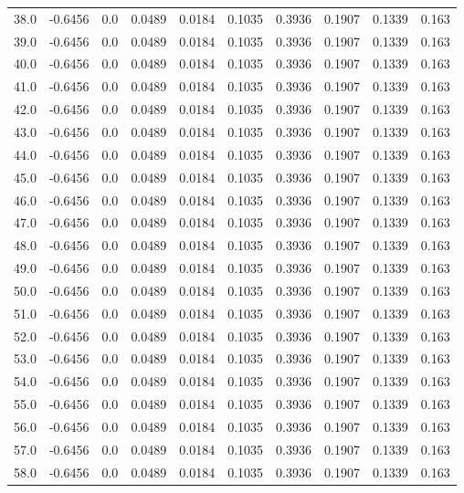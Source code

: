 \begin{longtable}{lrrrrrrrrr}
38.0 & -0.6456 & 0.0 & 0.0489 & 0.0184 & 0.1035 & 0.3936 & 0.1907 & 0.1339 & 0.163 \\
39.0 & -0.6456 & 0.0 & 0.0489 & 0.0184 & 0.1035 & 0.3936 & 0.1907 & 0.1339 & 0.163 \\
40.0 & -0.6456 & 0.0 & 0.0489 & 0.0184 & 0.1035 & 0.3936 & 0.1907 & 0.1339 & 0.163 \\
41.0 & -0.6456 & 0.0 & 0.0489 & 0.0184 & 0.1035 & 0.3936 & 0.1907 & 0.1339 & 0.163 \\
42.0 & -0.6456 & 0.0 & 0.0489 & 0.0184 & 0.1035 & 0.3936 & 0.1907 & 0.1339 & 0.163 \\
43.0 & -0.6456 & 0.0 & 0.0489 & 0.0184 & 0.1035 & 0.3936 & 0.1907 & 0.1339 & 0.163 \\
44.0 & -0.6456 & 0.0 & 0.0489 & 0.0184 & 0.1035 & 0.3936 & 0.1907 & 0.1339 & 0.163 \\
45.0 & -0.6456 & 0.0 & 0.0489 & 0.0184 & 0.1035 & 0.3936 & 0.1907 & 0.1339 & 0.163 \\
46.0 & -0.6456 & 0.0 & 0.0489 & 0.0184 & 0.1035 & 0.3936 & 0.1907 & 0.1339 & 0.163 \\
47.0 & -0.6456 & 0.0 & 0.0489 & 0.0184 & 0.1035 & 0.3936 & 0.1907 & 0.1339 & 0.163 \\
48.0 & -0.6456 & 0.0 & 0.0489 & 0.0184 & 0.1035 & 0.3936 & 0.1907 & 0.1339 & 0.163 \\
49.0 & -0.6456 & 0.0 & 0.0489 & 0.0184 & 0.1035 & 0.3936 & 0.1907 & 0.1339 & 0.163 \\
50.0 & -0.6456 & 0.0 & 0.0489 & 0.0184 & 0.1035 & 0.3936 & 0.1907 & 0.1339 & 0.163 \\
51.0 & -0.6456 & 0.0 & 0.0489 & 0.0184 & 0.1035 & 0.3936 & 0.1907 & 0.1339 & 0.163 \\
52.0 & -0.6456 & 0.0 & 0.0489 & 0.0184 & 0.1035 & 0.3936 & 0.1907 & 0.1339 & 0.163 \\
53.0 & -0.6456 & 0.0 & 0.0489 & 0.0184 & 0.1035 & 0.3936 & 0.1907 & 0.1339 & 0.163 \\
54.0 & -0.6456 & 0.0 & 0.0489 & 0.0184 & 0.1035 & 0.3936 & 0.1907 & 0.1339 & 0.163 \\
55.0 & -0.6456 & 0.0 & 0.0489 & 0.0184 & 0.1035 & 0.3936 & 0.1907 & 0.1339 & 0.163 \\
56.0 & -0.6456 & 0.0 & 0.0489 & 0.0184 & 0.1035 & 0.3936 & 0.1907 & 0.1339 & 0.163 \\
57.0 & -0.6456 & 0.0 & 0.0489 & 0.0184 & 0.1035 & 0.3936 & 0.1907 & 0.1339 & 0.163 \\
58.0 & -0.6456 & 0.0 & 0.0489 & 0.0184 & 0.1035 & 0.3936 & 0.1907 & 0.1339 & 0.163 \\

\end{longtable}
